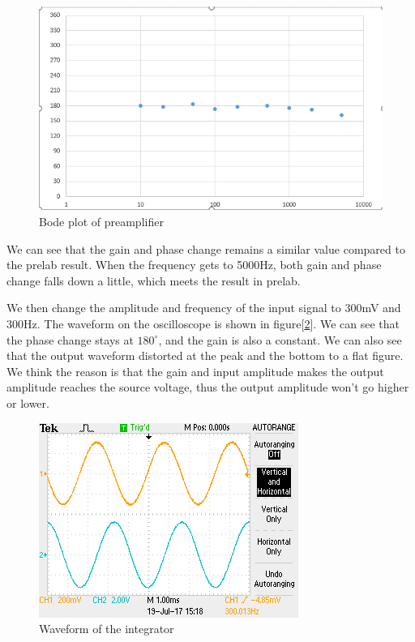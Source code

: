 \begin{figure}[!htbp]
	\centering 
	\begin{framed}
		\includegraphics[width=\linewidth]{images/1_2.PNG} 
		\caption{Bode plot of preamplifier}
		\label{fig:102} 
	\end{framed}
\end{figure}

\phantom{ } We can see that the gain and phase change remains a similar value compared to the prelab result. When the frequency gets to 5000Hz, both gain and phase change falls down a little, which meets the result in prelab.

\phantom{ } We then change the amplitude and frequency of the input signal to 300mV and 300Hz. The waveform on the oscilloscope is shown in figure[\ref{fig:103}]. We can see that the phase change stays at $ 180^{\circ} $, and the gain is also a constant. We can also see that the output waveform distorted at the peak and the bottom to a flat figure. We think the reason is that the gain and input amplitude makes the output amplitude reaches the source voltage, thus the output amplitude won't go higher or lower.\\
\begin{figure}[!htbp]
	\centering 
	\begin{framed}
		\includegraphics[width=\linewidth]{images/osc1.png}
		\caption{Waveform of the integrator}
		\label{fig:103} 
	\end{framed}
\end{figure} 

